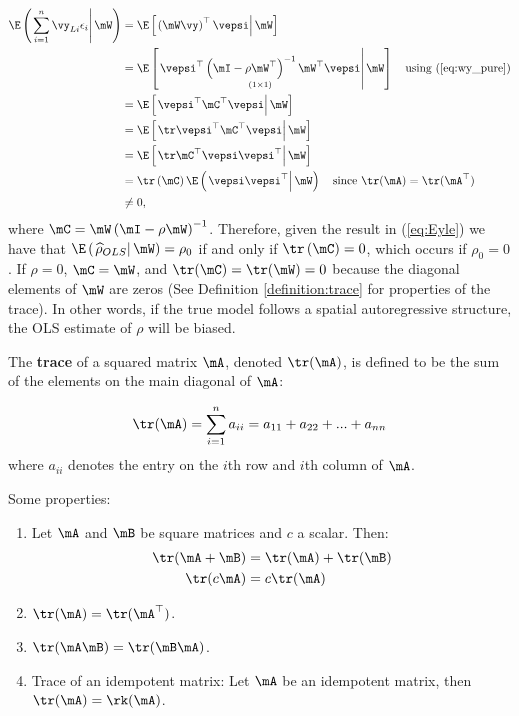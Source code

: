 \begin{equation}\label{eq:Eyle}
  \begin{aligned}
      \E\left(\left.\sum_{i = 1}^{n}\vy_{Li}\epsilon_i \right| \mW\right) & =  \E\left[\left.\left(\mW\vy \right)^\top\vepsi\right| \mW\right] \\
      & =  \E\left[\left.\underset{(1\times 1)}{\vepsi^\top \left( \mI -\rho \mW^\top\right)^{-1}\mW^\top\vepsi} \right| \mW \right] \quad \mbox{using (\ref{eq:wy_pure})}\\
      & =  \E\left[\left.\vepsi^\top \mC^\top \vepsi \right| \mW\right] \\
      & = \E\left[\left.\tr \vepsi^\top  \mC^\top\vepsi\right|\mW \right] \\
      & = \E\left[\left.\tr \mC^\top \vepsi\vepsi^\top\right| \mW\right] \\
      & =  \tr \left(\mC\right) \E\left(\left.\vepsi\vepsi^\top\right| \mW\right)\quad \mbox{since $\tr(\mA) = \tr(\mA^\top)$} \\
      & \neq 0,
  \end{aligned}
\end{equation}
%
where $\mC = \mW\left( \mI -\rho \mW\right)^{-1}$. Therefore, given the result in (\ref{eq:Eyle}) we have that $\E\left(\left.\widehat{\rho}_{OLS}\right| \mW\right) = \rho_0$ if and only if $\tr \left(\mC\right) = 0$, which occurs if $\rho_0 = 0$. If $\rho = 0$, $\mC = \mW$, and $\tr(\mC) = \tr(\mW) = 0$ because the diagonal elements of $\mW$ are zeros (See Definition \ref{definition:trace} for properties of the trace).  In other words, if the true model follows a spatial autoregressive structure, the OLS estimate of $\rho$ will be biased. 

\begin{definition}\label{definition:trace}
  The \textbf{trace} of a squared matrix $\mA$, denoted $\tr(\mA)$, is defined to be the sum of the elements on the main diagonal of $\mA$:
  
  \begin{equation}
    \tr(\mA) = \sum_{i = 1}^n a_{ii} = a_{11} + a_{22} + ... + a_{nn}
  \end{equation}
  where $a_{ii}$ denotes the entry on the $i$th row and $i$th column of $\mA$. 
  
 Some properties:
 \begin{enumerate}
  \item Let $\mA$ and $\mB$ be square matrices and $c$ a scalar. Then:
  \begin{align}
    \tr(\mA + \mB) & = \tr(\mA) + \tr(\mB) \\
    \tr(c\mA) & = c\tr(\mA)
  \end{align}
  \item $\tr(\mA) = \tr(\mA^{\top})$. 
  \item $\tr(\mA\mB) = \tr(\mB\mA)$.
  \item Trace of an idempotent matrix: Let $\mA$ be an idempotent matrix, then $\tr(\mA)= \rk(\mA)$. 
 \end{enumerate}
\end{definition}

